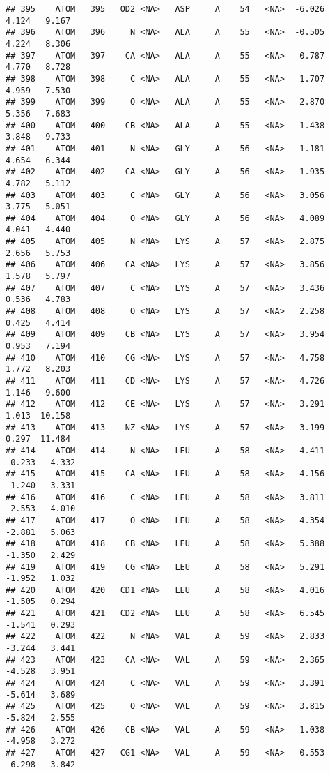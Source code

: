 \documentclass[
]{article}
\begin{document}
\begin{verbatim}
## 395    ATOM   395   OD2 <NA>   ASP     A    54   <NA>  -6.026   4.124   9.167
## 396    ATOM   396     N <NA>   ALA     A    55   <NA>  -0.505   4.224   8.306
## 397    ATOM   397    CA <NA>   ALA     A    55   <NA>   0.787   4.770   8.728
## 398    ATOM   398     C <NA>   ALA     A    55   <NA>   1.707   4.959   7.530
## 399    ATOM   399     O <NA>   ALA     A    55   <NA>   2.870   5.356   7.683
## 400    ATOM   400    CB <NA>   ALA     A    55   <NA>   1.438   3.848   9.733
## 401    ATOM   401     N <NA>   GLY     A    56   <NA>   1.181   4.654   6.344
## 402    ATOM   402    CA <NA>   GLY     A    56   <NA>   1.935   4.782   5.112
## 403    ATOM   403     C <NA>   GLY     A    56   <NA>   3.056   3.775   5.051
## 404    ATOM   404     O <NA>   GLY     A    56   <NA>   4.089   4.041   4.440
## 405    ATOM   405     N <NA>   LYS     A    57   <NA>   2.875   2.656   5.753
## 406    ATOM   406    CA <NA>   LYS     A    57   <NA>   3.856   1.578   5.797
## 407    ATOM   407     C <NA>   LYS     A    57   <NA>   3.436   0.536   4.783
## 408    ATOM   408     O <NA>   LYS     A    57   <NA>   2.258   0.425   4.414
## 409    ATOM   409    CB <NA>   LYS     A    57   <NA>   3.954   0.953   7.194
## 410    ATOM   410    CG <NA>   LYS     A    57   <NA>   4.758   1.772   8.203
## 411    ATOM   411    CD <NA>   LYS     A    57   <NA>   4.726   1.146   9.600
## 412    ATOM   412    CE <NA>   LYS     A    57   <NA>   3.291   1.013  10.158
## 413    ATOM   413    NZ <NA>   LYS     A    57   <NA>   3.199   0.297  11.484
## 414    ATOM   414     N <NA>   LEU     A    58   <NA>   4.411  -0.233   4.332
## 415    ATOM   415    CA <NA>   LEU     A    58   <NA>   4.156  -1.240   3.331
## 416    ATOM   416     C <NA>   LEU     A    58   <NA>   3.811  -2.553   4.010
## 417    ATOM   417     O <NA>   LEU     A    58   <NA>   4.354  -2.881   5.063
## 418    ATOM   418    CB <NA>   LEU     A    58   <NA>   5.388  -1.350   2.429
## 419    ATOM   419    CG <NA>   LEU     A    58   <NA>   5.291  -1.952   1.032
## 420    ATOM   420   CD1 <NA>   LEU     A    58   <NA>   4.016  -1.505   0.294
## 421    ATOM   421   CD2 <NA>   LEU     A    58   <NA>   6.545  -1.541   0.293
## 422    ATOM   422     N <NA>   VAL     A    59   <NA>   2.833  -3.244   3.441
## 423    ATOM   423    CA <NA>   VAL     A    59   <NA>   2.365  -4.528   3.951
## 424    ATOM   424     C <NA>   VAL     A    59   <NA>   3.391  -5.614   3.689
## 425    ATOM   425     O <NA>   VAL     A    59   <NA>   3.815  -5.824   2.555
## 426    ATOM   426    CB <NA>   VAL     A    59   <NA>   1.038  -4.958   3.272
## 427    ATOM   427   CG1 <NA>   VAL     A    59   <NA>   0.553  -6.298   3.842

\end{verbatim}
\end{document}
